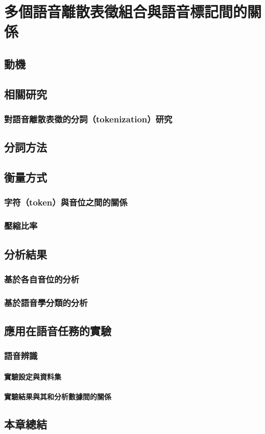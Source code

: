 \chapter{
    多個語音離散表徵組合與語音標記間的關係}



\section{動機}  %
\section{相關研究}
\subsection{對語音離散表徵的分詞（tokenization）研究}
\section{分詞方法}
\section{衡量方式}
\subsection{字符（token）與音位之間的關係}
\subsection{壓縮比率}
\section{分析結果}
\subsection{基於各自音位的分析}
\subsection{基於語音學分類的分析}

\newpage

\section{應用在語音任務的實驗}
\subsection{語音辨識}
\subsubsection{實驗設定與資料集}
\subsubsection{實驗結果與其和分析數據間的關係}
\section{本章總結}

